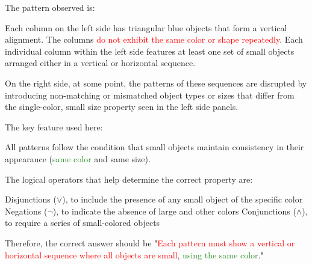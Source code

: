 \begin{tcolorbox}[breakable,enhanced jigsaw,opacityback=0,]
\begin{dialogue}
		The pattern observed is:
		
		Each column on the left side has triangular blue objects that form a vertical alignment.
		The columns \textcolor{red}{do not exhibit the same color or shape repeatedly}.
		Each individual column within the left side features at least one set of small objects arranged either in a vertical or horizontal sequence.
		
		On the right side, at some point, the patterns of these sequences are disrupted by introducing non-matching or mismatched object types or sizes that differ from the single-color, small size property seen in the left side panels.
		
		The key feature used here:
		
		All patterns follow the condition that small objects maintain consistency in their appearance (\textcolor{ForestGreen}{same color} and same size).
		
		The logical operators that help determine the correct property are:
		
		Disjunctions ($\vee$), to include the presence of any small object of the specific color
		Negations ($\neg$), to indicate the absence of large and other colors
		Conjunctions ($\wedge$), to require a series of small-colored objects
		
		Therefore, the correct answer should be "\textcolor{red}{Each pattern must show a vertical or horizontal sequence where all objects are small}, \textcolor{ForestGreen}{using the same color}."
	\end{dialogue}
	\label{fig:task5-bongard}
\end{tcolorbox}




